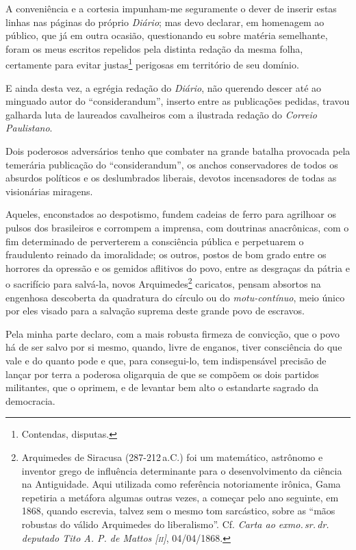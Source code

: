 A conveniência e a cortesia impunham-me seguramente o dever de inserir
estas linhas nas páginas do próprio \emph{Diário}; mas devo declarar, em
homenagem ao público, que já em outra ocasião, questionando eu sobre
matéria semelhante, foram os meus escritos repelidos pela distinta
redação da mesma folha, certamente para evitar justas\footnote{
  Contendas, disputas.} perigosas em território de seu domínio.

E ainda desta vez, a egrégia redação do \emph{Diário}, não querendo
descer até ao minguado autor do ``considerandum'', inserto entre as
publicações pedidas, travou galharda luta de laureados cavalheiros com a
ilustrada redação do \emph{Correio Paulistano}.

Dois poderosos adversários tenho que combater na grande batalha
provocada pela temerária publicação do ``considerandum'', os anchos
conservadores de todos os absurdos políticos e os deslumbrados liberais,
devotos incensadores de todas as visionárias miragens.

Aqueles, enconstados ao despotismo, fundem cadeias de ferro para
agrilhoar os pulsos dos brasileiros e corrompem a imprensa, com
doutrinas anacrônicas, com o fim determinado de perverterem a
consciência pública e perpetuarem o fraudulento reinado da imoralidade;
os outros, postos de bom grado entre os horrores da opressão e os
gemidos aflitivos do povo, entre as desgraças da pátria e o sacrifício
para salvá-la, novos Arquimedes\footnote{Arquimedes de Siracusa (287-212\,a.C.) 
foi um matemático, astrônomo e inventor grego de
  influência determinante para o desenvolvimento da ciência na
  Antiguidade. Aqui utilizada como referência notoriamente irônica, Gama
  repetiria a metáfora algumas outras vezes, a começar pelo ano
  seguinte, em 1868, quando escrevia, talvez sem o mesmo tom sarcástico,
  sobre as ``mãos robustas do válido Arquimedes do liberalismo''. Cf.
  \emph{Carta ao exmo.\,sr.\,dr.\,deputado Tito A. P. de Mattos {[}\textsc{ii}{]}},
  04/04/1868.\label{arquimedes}} caricatos, pensam absortos na engenhosa descoberta da
quadratura do círculo ou do \emph{motu-contínuo}, meio único por eles
visado para a salvação suprema deste grande povo de escravos.

Pela minha parte declaro, com a mais robusta firmeza de convicção, que o
povo há de ser salvo por si mesmo, quando, livre de enganos, tiver
consciência do que vale e do quanto pode e que, para consegui-lo, tem
indispensável precisão de lançar por terra a poderosa oligarquia de que
se compõem os dois partidos militantes, que o oprimem, e de levantar bem
alto o estandarte sagrado da democracia.

